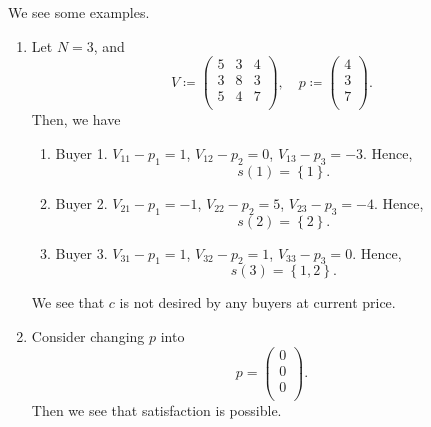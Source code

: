 \begin{eg}
	We see some examples.
	\begin{enumerate}
		\item Let \(N = 3\), and
		      \[
			      V\coloneqq \begin{pmatrix}
				      5 & 3 & 4 \\
				      3 & 8 & 3 \\
				      5 & 4 & 7 \\
			      \end{pmatrix}, \quad p \coloneqq \begin{pmatrix}
				      4 \\
				      3 \\
				      7 \\
			      \end{pmatrix}.
		      \]
		      Then, we have
		      \begin{enumerate}
			      \item Buyer 1. \(V_{11}-p_1 = 1\), \(V_{12} - p_2 = 0\), \(V_{13} - p_3 = -3\). Hence,
			            \[
				            s(1) = \left\{1\right\}.
			            \]
			      \item Buyer 2. \(V_{21}-p_1 = -1\), \(V_{22} - p_2 = 5\), \(V_{23} - p_3 = -4\). Hence,
			            \[
				            s(2) = \left\{2\right\}.
			            \]
			      \item Buyer 3. \(V_{31}-p_1 = 1\), \(V_{32} - p_2 = 1\), \(V_{33} - p_3 = 0\). Hence,
			            \[
				            s(3) = \left\{1, 2\right\}.
			            \]
		      \end{enumerate}
		      We see that \(c\) is not desired by any buyers at current price.
		      \begin{figure}[H]
			      \centering
			      \label{fig:satisfaction-eg-1}
		      \end{figure}
		\item Consider changing \(p\) into
		      \[
			      p = \begin{pmatrix}
				      0 \\
				      0 \\
				      0 \\
			      \end{pmatrix}.
		      \]
		      Then we see that satisfaction is possible.
		      \begin{figure}[H]
			      \centering
			      \label{fig:satisfaction-eg-2}
		      \end{figure}

\end{enumerate}
\end{eg}
